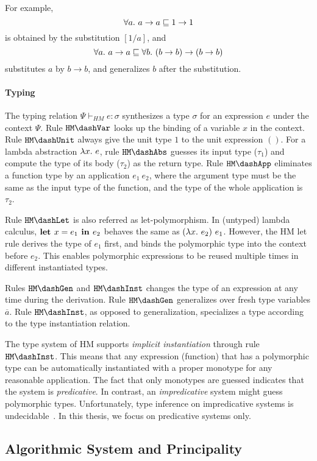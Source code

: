 For example, $$\all a \to a \sqsubseteq 1 \to 1$$
is obtained by the substitution $[1/a]$, and
$$\all a \to a \sqsubseteq \all[b] (b \to b) \to (b \to b)$$
substitutes $a$ by $b \to b$, and generalizes $b$ after the substitution.


\paragraph{Typing}
The typing relation $\Psi \vdash_{HM} e:\sigma$ synthesizes a type $\sigma$ for
an expression $e$ under the context $\Psi$.
Rule $\mathtt{HM \dash Var}$ looks up the binding of a variable $x$ in the context.
Rule $\mathtt{HM \dash Unit}$ always give the unit type $1$ to the unit expression $()$.
For a lambda abstraction $\lam e$, rule $\mathtt{HM \dash Abs}$ guesses its input type ($\tau_1$)
and compute the type of its body ($\tau_2$) as the return type.
Rule $\mathtt{HM \dash App}$ eliminates a function type by an application $e_1~e_2$,
where the argument type must be the same as the input type of the function,
and the type of the whole application is $\tau_2$.

Rule $\mathtt{HM \dash Let}$ is also referred as let-polymorphism.
In (untyped) lambda calculus, $\textbf{let } x={e_1} \textbf{ in } {e_2}$ behaves the same as $(\lam e_2)~e_1$.
However, the HM let rule derives the type of $e_1$ first,
and binds the polymorphic type into the context before $e_2$.
This enables polymorphic expressions to be reused multiple times in different instantiated types.

Rules $\mathtt{HM \dash Gen}$ and $\mathtt{HM \dash Inst}$ changes the type of an expression
at any time during the derivation.
Rule $\mathtt{HM \dash Gen}$ generalizes over fresh type variables $\overline{a}$.
Rule $\mathtt{HM \dash Inst}$, as opposed to generalization, specializes a type
according to the type instantiation relation.

The type system of HM supports \emph{implicit instantiation} through
rule $\mathtt{HM \dash Inst}$.
This means that any expression (function) that has a polymorphic type
can be automatically instantiated with a proper monotype for any reasonable application.
The fact that only monotypes are guessed indicates that the system is \emph{predicative}.
In contrast, an \emph{impredicative} system might guess polymorphic types.
Unfortunately, type inference on impredicative systems is undecidable~\citep{wells1999typability}.
In this thesis, we focus on predicative systems only.

\subsection{Algorithmic System and Principality}

